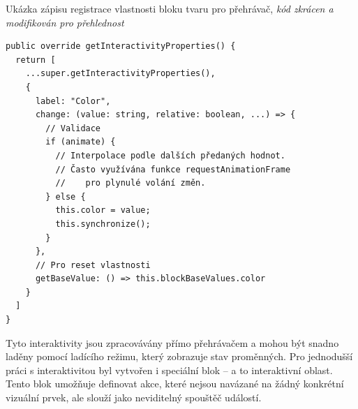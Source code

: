 \begin{listing}[ht!]
\caption[Ukázka zápisu registrace vlastnosti bloku tvaru pro přehrávač]{Ukázka zápisu registrace vlastnosti bloku tvaru pro přehrávač, \textit{kód zkrácen a modifikován pro přehlednost}}\label{code:zapisVlastnostiPrehravac}
\begin{verbatim}
public override getInteractivityProperties() {
  return [
    ...super.getInteractivityProperties(),
    {
      label: "Color",
      change: (value: string, relative: boolean, ...) => {
        // Validace
        if (animate) {
          // Interpolace podle dalších předaných hodnot.
          // Často využívána funkce requestAnimationFrame
          //    pro plynulé volání změn.
        } else {
          this.color = value;
          this.synchronize();
        }
      },
      // Pro reset vlastnosti
      getBaseValue: () => this.blockBaseValues.color
    }
  ]
}
\end{verbatim}
\end{listing}

Tyto interaktivity jsou zpracovávány přímo přehrávačem a mohou být snadno laděny pomocí ladícího režimu, který zobrazuje stav proměnných. 
Pro jednodušší práci s interaktivitou byl vytvořen i speciální blok -- a to interaktivní oblast.
Tento blok umožňuje definovat akce, které nejsou navázané na žádný konkrétní vizuální prvek, ale slouží jako neviditelný spouštěč událostí.





